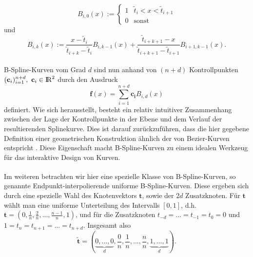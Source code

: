 \[
B_{i,0}(x) := \begin{cases} 1& \tilde{t}_i<x<\tilde{t}_{i+1} \\ 0& \text{sonst} \end{cases}
\]
und
\[
B_{i,k}(x) := \frac{x-\tilde{t}_i}{\tilde{t}_{i+k}-\tilde{t}_i}B_{i,k-1}(x) + \frac{\tilde{t}_{i+k+1}-x}{\tilde{t}_{i+k+1}-\tilde{t}_{i+1}}B_{i+1,k-1}(x).
\]
\\
%
B-Spline-Kurven vom Grad $d$ sind nun anhand von $(n+d)$ Kontrollpunkten $(\mathbf{c}_i)_{i=1}^{n+d},\ \mathbf{c}_i\in\R^2$ durch den Ausdruck
\[
\mathbf{f}(x)=\sum_{i=1}^{n+d}\mathbf{c_i}B_{i,d}(x)
\]
definiert. Wie sich herausstellt, besteht ein relativ intuitiver Zusammenhang zwischen der Lage der Kontrollpunkte in der Ebene und dem Verlauf der resultierenden Splinekurve. Dies ist darauf zurückzuführen, dass die hier gegebene Definition einer geometrischen Konstruktion ähnlich der von Bezier-Kurven entspricht
. Diese Eigenschaft macht B-Spline-Kurven zu einem idealen Werkzeug für das interaktive Design von Kurven.\\
\\
Im weiteren betrachten wir hier eine spezielle Klasse von B-Spline-Kurven, so genannte Endpunkt-interpolierende uniforme B-Spline-Kurven. Diese ergeben sich durch eine spezielle Wahl des Knotenvektors $\mathbf{t}$, sowie der $2d$ Zusatzknoten. Für $\mathbf{t}$ wählt man eine uniforme Unterteilung des Intervalls $[0,1]$, d.h. $\mathbf{t}=(0,\frac{1}{n},\frac{2}{n},...,\frac{n-1}{n},1)$, und für die Zusatzknoten $t_{-d}=...=t_{-1}=t_0=0$ und $1=t_n=t_{n+1}=...=t_{n+d}$. Insgesamt also
\[
\mathbf{\tilde{t}}=(\underbrace{0,...,0}_{d},\frac{0}{n},\frac{1}{n},...,\frac{n}{n},\underbrace{1,...,1}_{d}).
\]
%

